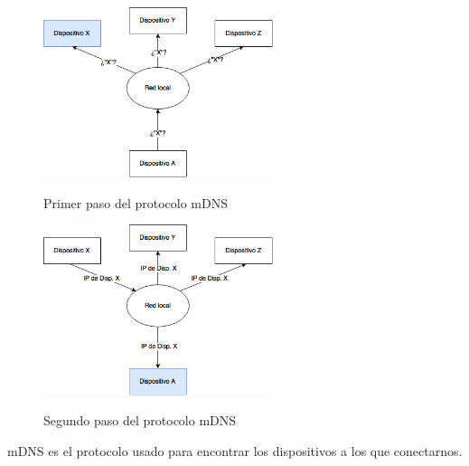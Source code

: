 \begin{figure}[H]
	\centering
	\includegraphics[width=0.6\textwidth]{./Imagenes/mdns1.png}
	\label{fig:mdns1}
	\caption{Primer paso del protocolo mDNS}
\end{figure}

\begin{figure}[H]
	\centering
	\includegraphics[width=0.6\textwidth]{./Imagenes/mdns2.png}
	\label{fig:mdns2}
	\caption{Segundo paso del protocolo mDNS}
\end{figure}

mDNS es el protocolo usado para encontrar los dispositivos a los que conectarnos.
